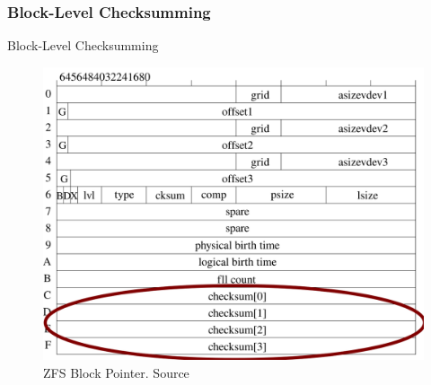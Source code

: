 \subsubsection{Block-Level Checksumming}
\begin{frame}{Block-Level Checksumming}
	\begin{figure}
		\centering
		\includegraphics[height=0.75\textheight]{assets/contrib/mckusick/block_pointer_checksum_highlighted}
		\caption{ZFS Block Pointer. Source \cite{introimplzfs}}
	\end{figure}
\end{frame}

